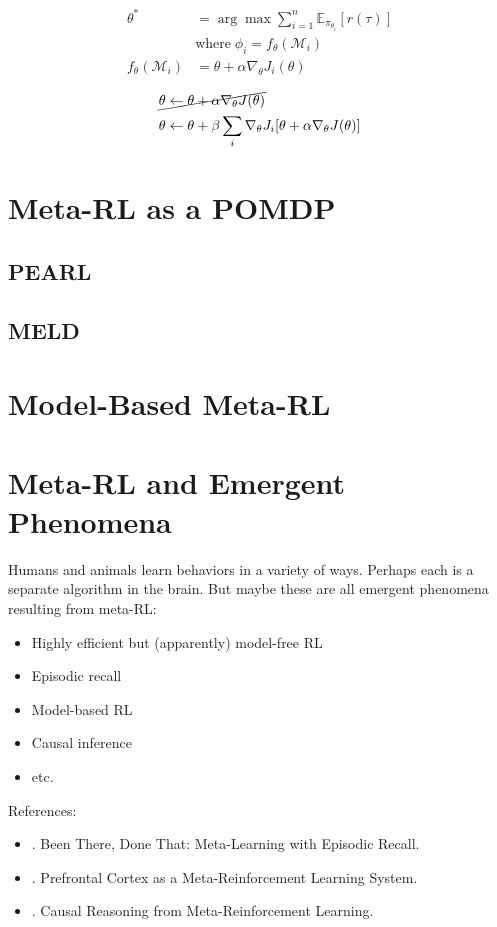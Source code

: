 \begin{align}
	\theta^* &= \arg\max \sum_{i=1}^n \mathbb{E}_{\pi_{\theta_i}} [r(\tau)]\\
	&\text{where}\; \phi_i = f_\theta(\mathcal{M}_i)\\
	f_\theta(\mathcal{M}_i) &= \theta + \alpha \nabla_\theta J_i(\theta)
\end{align}

\begin{align}
	&\cancel{\theta \leftarrow \theta + \alpha \nabla_\theta J(\theta)}\\
	&\theta \leftarrow \theta + \beta \sum_i \nabla_\theta J_i[\theta + \alpha \nabla_\theta J(\theta)]
\end{align}

\section{Meta-RL as a POMDP}
\subsection{PEARL}
\subsection{MELD}

\section{Model-Based Meta-RL}

\section{Meta-RL and Emergent Phenomena}
Humans and animals learn behaviors in a variety of ways. Perhaps each is a separate algorithm in the brain. But maybe these are all emergent phenomena resulting from meta-\ac{RL}:
\begin{itemize}
	\item Highly efficient but (apparently) model-free RL
	\item Episodic recall
	\item Model-based RL
	\item Causal inference
	\item etc.
\end{itemize}

References:
\begin{itemize}
	\item {}. Been There, Done That: Meta-Learning with Episodic Recall.
	\item {}. Prefrontal Cortex as a Meta-Reinforcement Learning System.
	\item {}. Causal Reasoning from Meta-Reinforcement Learning.
\end{itemize}

